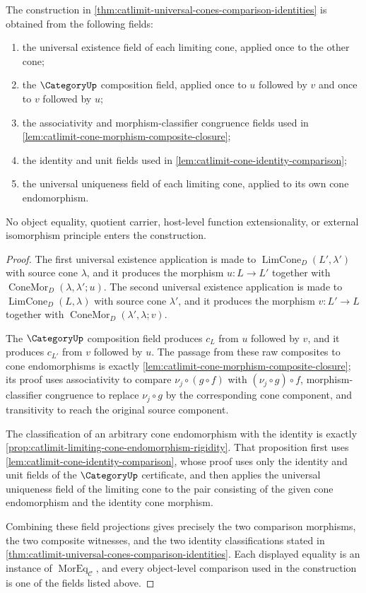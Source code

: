 \begin{proposition}\label{prop:catlimit-apex-comparison-field-dependency}
The construction in \autoref{thm:catlimit-universal-cones-comparison-identities} is obtained from the following fields:
\begin{enumerate}
\item the universal existence field of each limiting cone, applied once to the other cone;
\item the $\CategoryUp$ composition field, applied once to $u$ followed by $v$ and once to $v$ followed by $u$;
\item the associativity and morphism-classifier congruence fields used in \autoref{lem:catlimit-cone-morphism-composite-closure};
\item the identity and unit fields used in \autoref{lem:catlimit-cone-identity-comparison};
\item the universal uniqueness field of each limiting cone, applied to its own cone endomorphism.
\end{enumerate}
No object equality, quotient carrier, host-level function extensionality, or external isomorphism principle enters the construction.
\end{proposition}
\begin{proof}
The first universal existence application is made to $\operatorname{LimCone}_{D}(L',\lambda')$ with source cone $\lambda$, and it produces the morphism $u:L\to L'$ together with $\operatorname{ConeMor}_{D}(\lambda,\lambda';u)$. The second universal existence application is made to $\operatorname{LimCone}_{D}(L,\lambda)$ with source cone $\lambda'$, and it produces the morphism $v:L'\to L$ together with $\operatorname{ConeMor}_{D}(\lambda',\lambda;v)$.

The $\CategoryUp$ composition field produces $c_L$ from $u$ followed by $v$, and it produces $c_{L'}$ from $v$ followed by $u$. The passage from these raw composites to cone endomorphisms is exactly \autoref{lem:catlimit-cone-morphism-composite-closure}; its proof uses associativity to compare $\nu_j\circ(g\circ f)$ with $(\nu_j\circ g)\circ f$, morphism-classifier congruence to replace $\nu_j\circ g$ by the corresponding cone component, and transitivity to reach the original source component.

The classification of an arbitrary cone endomorphism with the identity is exactly \autoref{prop:catlimit-limiting-cone-endomorphism-rigidity}. That proposition first uses \autoref{lem:catlimit-cone-identity-comparison}, whose proof uses only the identity and unit fields of the $\CategoryUp$ certificate, and then applies the universal uniqueness field of the limiting cone to the pair consisting of the given cone endomorphism and the identity cone morphism.

Combining these field projections gives precisely the two comparison morphisms, the two composite witnesses, and the two identity classifications stated in \autoref{thm:catlimit-universal-cones-comparison-identities}. Each displayed equality is an instance of $\operatorname{MorEq}_{\mathcal C}$, and every object-level comparison used in the construction is one of the fields listed above.
\end{proof}
